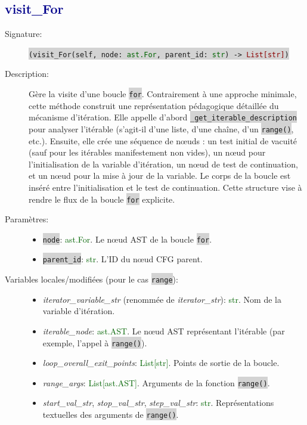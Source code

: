 \documentclass[11pt,a4paper]{article}
\newcommand{\code}[1]{\colorbox{lightgray}{\texttt{\small #1}}}
\newcommand{\var}[1]{\textit{#1}}
\newcommand{\vartype}[1]{\textcolor{darkgreen}{#1}}
\newcommand{\methodname}[1]{\textbf{\textcolor{darkblue}{#1}}}
\newcommand{\param}[1]{\code{#1}}
\newcommand{\rettype}[1]{\textcolor{darkred}{#1}}
\begin{document}
\subsection*{\methodname{visit\_For}}
\begin{description}
    \item[Signature:] \code{(visit\_For(self, node: \vartype{ast.For}, parent\_id: \vartype{str}) -> \rettype{List[str]})}
    \item[Description:] Gère la visite d'une boucle \code{for}. Contrairement à une approche minimale, cette méthode construit une représentation pédagogique détaillée du mécanisme d'itération. Elle appelle d'abord \code{\_get\_iterable\_description} pour analyser l'itérable (s'agit-il d'une liste, d'une chaîne, d'un \code{range()}, etc.). Ensuite, elle crée une séquence de nœuds : un test initial de vacuité (sauf pour les itérables manifestement non vides), un nœud pour l'initialisation de la variable d'itération, un nœud de test de continuation, et un nœud pour la mise à jour de la variable. Le corps de la boucle est inséré entre l'initialisation et le test de continuation. Cette structure vise à rendre le flux de la boucle \code{for} explicite.    \item[Paramètres:]
    \begin{itemize}
        \item \param{node}: \vartype{ast.For}. Le nœud AST de la boucle \code{for}.
        \item \param{parent\_id}: \vartype{str}. L'ID du nœud CFG parent.
    \end{itemize}
    \item[Variables locales/modifiées (pour le cas \code{range}):]
    \begin{itemize}
        \item \var{iterator\_variable\_str} (renommée de \var{iterator\_str}): \vartype{str}. Nom de la variable d'itération.
        \item \var{iterable\_node}: \vartype{ast.AST}. Le nœud AST représentant l'itérable (par exemple, l'appel à \code{range()}).
        \item \var{loop\_overall\_exit\_points}: \vartype{List[str]}. Points de sortie de la boucle.
        \item \var{range\_args}: \vartype{List[ast.AST]}. Arguments de la fonction \code{range()}.
        \item \var{start\_val\_str}, \var{stop\_val\_str}, \var{step\_val\_str}: \vartype{str}. Représentations textuelles des arguments de \code{range()}.

\end{itemize}
\end{description}
\end{document}
